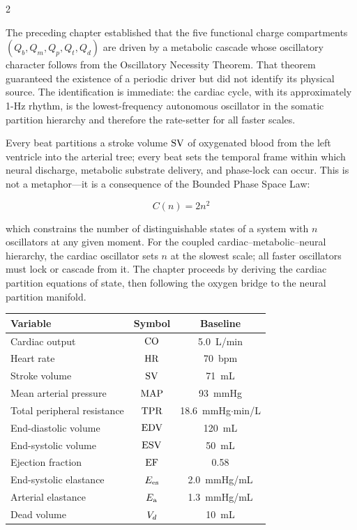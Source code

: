 \begin{multicols}{2}

The preceding chapter established that the five functional charge
compartments $(Q_b, Q_m, Q_p, Q_t, Q_d)$ are driven by a metabolic
cascade whose oscillatory character follows from the Oscillatory
Necessity Theorem. That theorem guaranteed the existence of a periodic
driver but did not identify its physical source. The identification is
immediate: the cardiac cycle, with its approximately 1-Hz rhythm, is
the lowest-frequency autonomous oscillator in the somatic partition
hierarchy and therefore the rate-setter for all faster scales.

Every beat partitions a stroke volume $\mathrm{SV}$ of oxygenated blood from
the left ventricle into the arterial tree; every beat sets the temporal
frame within which neural discharge, metabolic substrate delivery, and
phase-lock can occur. This is not a metaphor---it is a consequence of
the Bounded Phase Space Law:

\begin{equation}
C(n) = 2n^2
\label{eq:ch09-BPS}
\end{equation}

which constrains the number of distinguishable states of a system
with $n$ oscillators at any given moment. For the coupled
cardiac--metabolic--neural hierarchy, the cardiac oscillator sets $n$
at the slowest scale; all faster oscillators must lock or cascade from
it. The chapter proceeds by deriving the cardiac partition equations
of state, then following the oxygen bridge to the neural partition
manifold.

\columnbreak

\begin{center}
\begin{tabular}{lcc}
\toprule
\textbf{Variable} & \textbf{Symbol} & \textbf{Baseline}\\
\midrule
Cardiac output & $\mathrm{CO}$ & 5.0~L/min \\
Heart rate & $\mathrm{HR}$ & 70~bpm \\
Stroke volume & $\mathrm{SV}$ & 71~mL \\
Mean arterial pressure & $\mathrm{MAP}$ & 93~mmHg \\
Total peripheral resistance & $\mathrm{TPR}$ & 18.6~mmHg$\cdot$min/L \\
End-diastolic volume & $\mathrm{EDV}$ & 120~mL \\
End-systolic volume & $\mathrm{ESV}$ & 50~mL \\
Ejection fraction & $\mathrm{EF}$ & 0.58 \\
End-systolic elastance & $E_{\mathrm{es}}$ & 2.0~mmHg/mL \\
Arterial elastance & $E_{\mathrm{a}}$ & 1.3~mmHg/mL \\
Dead volume & $V_d$ & 10~mL \\
\bottomrule
\end{tabular}
\label{tab:ch09-baseline}
\end{center}

\end{multicols}

